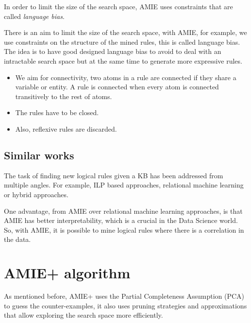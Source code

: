\documentclass{article}
\begin{document}
In order to limit the size of the search space, AMIE uses constraints that are called
\textit{language bias}.


There is an aim to limit the size of the search space, with AMIE, for example,
we use constraints on the structure of the mined rules, this is called language
bias. The idea is to have good designed language bias to avoid to deal with an
intractable search space but at the same time to generate more expressive rules.

\begin{itemize}
    \item We aim for connectivity, two atoms in a rule are connected if they share a variable or
entity. A rule is connected when every atom is connected transitively to the
rest of atoms.
    \item The rules have to be closed.
    \item Also, reflexive rules are discarded.
\end{itemize}

\subsection{Similar works}

The task of finding new logical rules given a KB has been addressed from
multiple angles. For example, ILP based approaches, relational machine learning
or hybrid approaches.

One advantage, from AMIE over relational machine learning approaches, is that
AMIE has better interpretability, which is a crucial in the Data Science world.
So, with AMIE, it is possible to mine logical rules where there is a
correlation in the data.

\section{AMIE+ algorithm}


As mentioned before, AMIE+ uses the Partial Completeness Assumption (PCA) to
guess the counter-examples, it also uses pruning strategies and approximations
that allow exploring the search space more efficiently.
\end{document}
